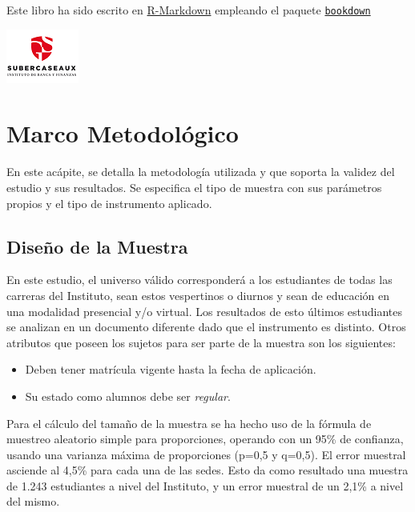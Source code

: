 \documentclass[]{book}
\providecommand{\tightlist}{%
  \setlength{\itemsep}{0pt}\setlength{\parskip}{0pt}}
\begin{document}
Este libro ha sido escrito en
\href{http://rmarkdown.rstudio.com}{R-Markdown} empleando el paquete
\href{https://bookdown.org/yihui/bookdown/}{\texttt{bookdown}}

\begin{flushleft}\includegraphics{images/IconoIGS} \end{flushleft}

\chapter{Marco Metodológico}\label{intro}

En este acápite, se detalla la metodología utilizada y que soporta la
validez del estudio y sus resultados. Se especifica el tipo de muestra
con sus parámetros propios y el tipo de instrumento aplicado.

\section{Diseño de la Muestra}\label{requisitos}

En este estudio, el universo válido corresponderá a los estudiantes de
todas las carreras del Instituto, sean estos vespertinos o diurnos y
sean de educación en una modalidad presencial y/o virtual. Los
resultados de esto últimos estudiantes se analizan en un documento
diferente dado que el instrumento es distinto. Otros atributos que
poseen los sujetos para ser parte de la muestra son los siguientes:

\begin{itemize}
\tightlist
\item
  Deben tener matrícula vigente hasta la fecha de aplicación.
\item
  Su estado como alumnos debe ser \emph{regular}.
\end{itemize}

Para el cálculo del tamaño de la muestra se ha hecho uso de la fórmula
de muestreo aleatorio simple para proporciones, operando con un 95\% de
confianza, usando una varianza máxima de proporciones (p=0,5 y q=0,5).
El error muestral asciende al 4,5\% para cada una de las sedes. Esto da
como resultado una muestra de 1.243 estudiantes a nivel del Instituto, y
un error muestral de un 2,1\% a nivel del mismo.
\end{document}
